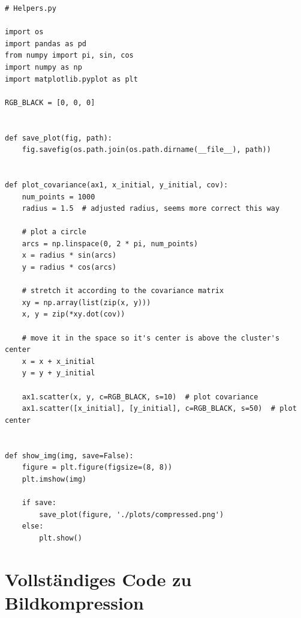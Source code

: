 \begin{lstlisting}[style=py]
# Helpers.py

import os
import pandas as pd
from numpy import pi, sin, cos
import numpy as np
import matplotlib.pyplot as plt

RGB_BLACK = [0, 0, 0]


def save_plot(fig, path):
    fig.savefig(os.path.join(os.path.dirname(__file__), path))


def plot_covariance(ax1, x_initial, y_initial, cov):
    num_points = 1000
    radius = 1.5  # adjusted radius, seems more correct this way

    # plot a circle
    arcs = np.linspace(0, 2 * pi, num_points)
    x = radius * sin(arcs)
    y = radius * cos(arcs)

    # stretch it according to the covariance matrix
    xy = np.array(list(zip(x, y)))
    x, y = zip(*xy.dot(cov))

    # move it in the space so it's center is above the cluster's center
    x = x + x_initial
    y = y + y_initial

    ax1.scatter(x, y, c=RGB_BLACK, s=10)  # plot covariance
    ax1.scatter([x_initial], [y_initial], c=RGB_BLACK, s=50)  # plot center


def show_img(img, save=False):
    figure = plt.figure(figsize=(8, 8))
    plt.imshow(img)

    if save:
        save_plot(figure, './plots/compressed.png')
    else:
        plt.show()

\end{lstlisting}

\section*{Vollständiges Code zu Bildkompression}

